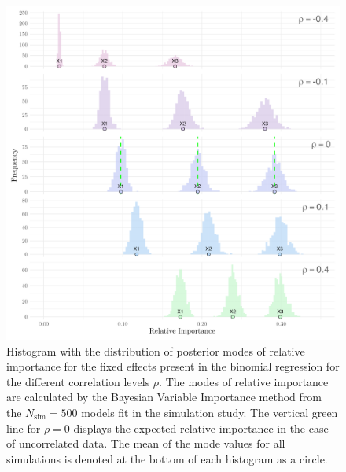 \begin{figure}[H]
  \centering
  \includegraphics[width=1\linewidth]{Figures/Simulation study/Fixed_combined_logit.png}
  \caption[Relative importance of the fixed effects in binomial GLMM]{Histogram with the distribution of posterior modes of relative importance for the fixed effects present in the binomial regression for the different correlation levels $\rho$. The modes of relative importance are calculated by the Bayesian Variable Importance method from the $N_{\text{sim}}=500$ models fit in the simulation study. The vertical green line for $\rho=0$ displays the expected relative importance in the case of uncorrelated data. The mean of the mode values for all simulations is denoted at the bottom of each histogram as a circle.}
  \label{fig:fixed_combined_logit}
\end{figure}
